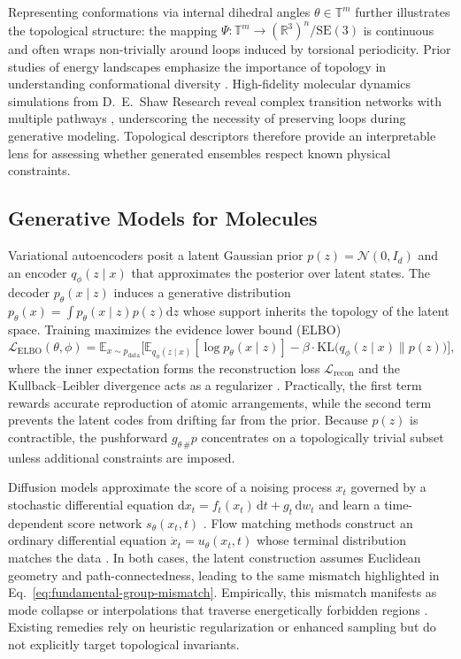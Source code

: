 \documentclass[11pt]{article}
\begin{document}
Representing conformations via internal dihedral angles $\theta \in \mathbb{T}^m$ further illustrates the topological structure: the mapping $\Psi : \mathbb{T}^m \to (\mathbb{R}^3)^n / \mathrm{SE}(3)$ is continuous and often wraps non-trivially around loops induced by torsional periodicity. Prior studies of energy landscapes emphasize the importance of topology in understanding conformational diversity \cite{wales2001microscopic}. High-fidelity molecular dynamics simulations from D.~E.~Shaw Research reveal complex transition networks with multiple pathways \cite{shaw2010atomic}, underscoring the necessity of preserving loops during generative modeling. Topological descriptors therefore provide an interpretable lens for assessing whether generated ensembles respect known physical constraints.

\subsection{Generative Models for Molecules}
Variational autoencoders posit a latent Gaussian prior $p(z) = \mathcal{N}(0, I_d)$ and an encoder $q_\phi(z \mid x)$ that approximates the posterior over latent states. The decoder $p_\theta(x \mid z)$ induces a generative distribution $p_\theta(x) = \int p_\theta(x \mid z) p(z) \mathrm{d}z$ whose support inherits the topology of the latent space. Training maximizes the evidence lower bound (ELBO)
\begin{equation}
    \mathcal{L}_{\text{ELBO}}(\theta, \phi) = \mathbb{E}_{x \sim p_{\text{data}}} \big[ \mathbb{E}_{q_\phi(z \mid x)} [\log p_\theta(x \mid z)] - \beta \cdot \mathrm{KL}\big(q_\phi(z \mid x) \big\| p(z)\big) \big],
    \label{eq:elbo}
\end{equation}
where the inner expectation forms the reconstruction loss $\mathcal{L}_{\text{recon}}$ and the Kullback--Leibler divergence acts as a regularizer \cite{kingma2014auto}. Practically, the first term rewards accurate reproduction of atomic arrangements, while the second term prevents the latent codes from drifting far from the prior. Because $p(z)$ is contractible, the pushforward $g_{\theta\,\#}p$ concentrates on a topologically trivial subset unless additional constraints are imposed.

Diffusion models approximate the score of a noising process $x_t$ governed by a stochastic differential equation $\mathrm{d}x_t = f_t(x_t) \, \mathrm{d}t + g_t \, \mathrm{d}w_t$ and learn a time-dependent score network $s_\theta(x_t, t)$ \cite{song2021score}. Flow matching methods construct an ordinary differential equation $\dot{x}_t = u_\theta(x_t, t)$ whose terminal distribution matches the data \cite{lipman2023flow}. In both cases, the latent construction assumes Euclidean geometry and path-connectedness, leading to the same mismatch highlighted in Eq.~\eqref{eq:fundamental-group-mismatch}. Empirically, this mismatch manifests as mode collapse or interpolations that traverse energetically forbidden regions \cite{noe2019boltzmann, trippe2023diffusion}. Existing remedies rely on heuristic regularization or enhanced sampling but do not explicitly target topological invariants.
\end{document}
